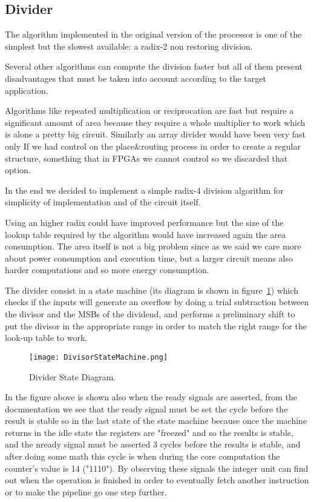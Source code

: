 \subsection{Divider}


The algorithm implemented in the original version of the processor is one of the simplest but the
slowest available: a radix-2 non restoring division.

Several other algorithms can compute the division faster but all of them present disadvantages
that must be taken into account according to the target application.

Algorithms like repeated multiplication or reciprocation are fast but require a significant amount
of area because they require a whole multiplier to work which is alone a pretty big circuit.
Similarly an array divider would have been very fast only If we had control on the
place\&routing process in order to create a regular structure, something that in FPGAs we cannot control so we discarded that option. 

In the end we decided to implement
a simple radix-4 division algorithm for simplicity of implementation and of the circuit itself.

Using an higher radix could have improved performance but the size of the lookup table required
by the algorithm would have increased again the area consumption.
The area itself is not a big problem since as we said we care more about power consumption and execution time, but a larger circuit means also harder computations and so more energy consumption.

The divider consist in a state machine (its diagram is shown in figure~\ref{fig:div_state_dia}) which checks if the inputs will
generate an overflow by doing a trial subtraction between the divisor and the MSBs of the dividend, and performs a preliminary shift to put the divisor in the appropriate range in order to match the right range for the look-up table to work.


\begin{figure}[H]
\centering
\texttt{[image: DivisorStateMachine.png]}
\caption{Divider State Diagram.}
\label{fig:div_state_dia}
\end{figure}

In the figure above is shown also when the ready signals are asserted, from the documentation we see that the ready signal must be set the cycle before the result is stable so in the last state of the state machine because once the machine returns in the idle state the registers are "freezed" and so the results is stable, and the nready signal must be asserted 3 cycles before the results is stable, and after doing some math this cycle is when during the core computation the counter's value is 14 ("1110"). 
By observing these signals the integer unit can find out when the operation is finished in order to eventually fetch another instruction or to make the pipeline go one step further.

